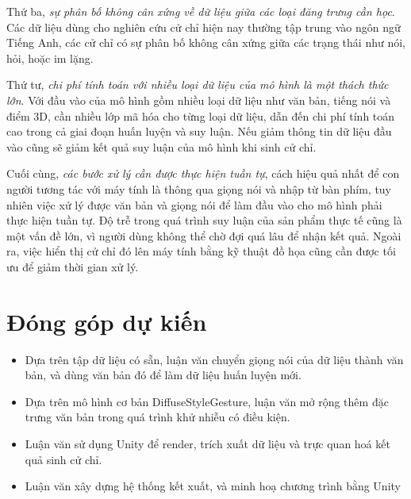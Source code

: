 Thứ ba, \textit{sự phân bố không cân xứng về  dữ liệu giữa các loại đăng trưng cần học}. Các dữ liệu dùng cho nghiên cứu cử chỉ hiện nay thường tập trung vào ngôn ngữ Tiếng Anh, các cử chỉ có sự phân bố không cân xứng giữa các trạng thái như nói, hỏi, hoặc im lặng.

Thứ tư, \textit{chi phí tính toán với nhiều loại dữ liệu của mô hình là một thách thức lớn}. Với đầu vào của mô hình gồm nhiều loại dữ liệu như văn bản, tiếng nói và điểm 3D, cần nhiều lớp mã hóa cho từng loại dữ liệu, dẫn đến chi phí tính toán cao trong cả giai đoạn huấn luyện và suy luận. Nếu giảm thông tin dữ liệu đầu vào cũng sẽ giảm kết quả suy luận của mô hình khi sinh cử chỉ.

Cuối cùng, \textit{các bước xử lý cần được thực hiện tuần tự}, cách hiệu quả nhất để con người tương tác với máy tính là thông qua giọng nói và nhập từ bàn phím, tuy nhiên việc xử lý được văn bản và giọng nói để làm đầu vào cho mô hình phải thực hiện tuần tự. Độ trễ trong quá trình suy luận của sản phẩm thực tế cũng là một vấn đề lớn, vì người dùng không thể chờ đợi quá lâu để nhận kết quả. Ngoài ra, việc hiển thị cử chỉ đó lên máy tính bằng kỹ thuật đồ họa cũng cần được tối ưu để giảm thời gian xử lý.


\section{Đóng góp dự kiến}


\begin{itemize}
	\item Dựa trên tập dữ liệu có sẵn, luận văn chuyển giọng nói của dữ liệu thành văn bản, và dùng văn bản đó để làm dữ liệu huấn luyện mới.
	
	\item Dựa trên mô hình cơ bản DiffuseStyleGesture, luận văn mở rộng thêm đặc trưng văn bản trong quá trình khử nhiễu có điều kiện.
	
	\item Luận văn sử dụng Unity để render, trích xuất dữ liệu và trực quan hoá kết quả sinh cử chỉ.
	
	\item Luận văn xây dựng hệ thống kết xuất, và minh hoạ chương trình bằng Unity
\end{itemize}




